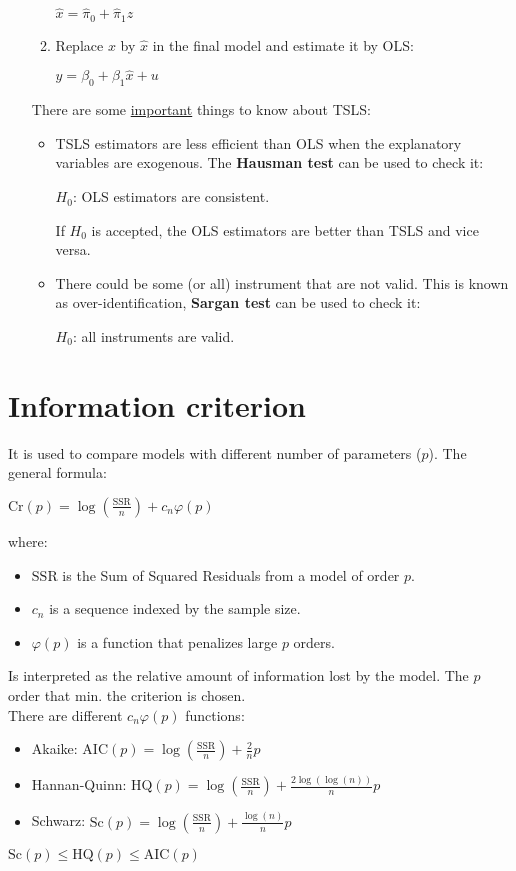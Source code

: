 \documentclass[10pt, a4paper, landscape]{extarticle}
\newcommand{\SSR}{\mathrm{SSR}}
\begin{document}
\begin{multicols}{3}
\begin{itemize}[leftmargin=*]
\begin{enumerate}[leftmargin=*]
\begin{center}
						$\hat{x} = \hat{\pi}_0 + \hat{\pi}_1 z$
					\end{center}
					\item Replace $x$ by $\hat{x}$ in the final model and estimate it by OLS:
					\begin{center}
						$y = \beta_0 + \beta_1 \hat{x} + u$
					\end{center}
				\end{enumerate}
				There are some \underline{important} things to know about TSLS:
				\begin{itemize}[leftmargin=*]
					\item TSLS estimators are less efficient than OLS when the explanatory variables are exogenous. The \textbf{Hausman test} can be used to check it:
					\begin{center}
						$H_0$: OLS estimators are consistent.
					\end{center}
					If $H_0$ is accepted, the OLS estimators are better than TSLS and vice versa.
					\item There could be some (or all) instrument that are not valid. This is known as over-identification, \textbf{Sargan test} can be used to check it:
					\begin{center}
						$H_0$: all instruments are valid.
					\end{center}
				\end{itemize}
			\end{itemize}
\columnbreak
\section*{Information criterion}
	It is used to compare models with different number of parameters ($p$). The general formula:
	\begin{center}
		$\mathrm{Cr}(p) = \log(\frac{\SSR}{n}) + c_n \varphi (p)$
	\end{center}
	where:
	\begin{itemize}[leftmargin=*]
		\item $\SSR$ is the Sum of Squared Residuals from a model of order $p$.
		\item $c_n$ is a sequence indexed by the sample size.
		\item $\varphi(p)$ is a function that penalizes large $p$ orders.
	\end{itemize}
	Is interpreted as the relative amount of information lost by the model. The $p$ order that min. the criterion is chosen. \\
	There are different $c_n \varphi(p)$ functions:
	\begin{itemize}[leftmargin=*]
		\item Akaike: $\mathrm{AIC}(p) = \log(\frac{\SSR}{n}) + \frac{2}{n} p$
		\item Hannan-Quinn: $\mathrm{HQ}(p) = \log(\frac{\SSR}{n}) + \frac{2 \log(\log(n))}{n} p$
		\item Schwarz: $\mathrm{Sc}(p) = \log(\frac{\SSR}{n}) + \frac{\log(n)}{n} p$
	\end{itemize}
	$\mathrm{Sc}(p) \leq \mathrm{HQ}(p) \leq \mathrm{AIC}(p)$


\end{multicols}
\end{document}
